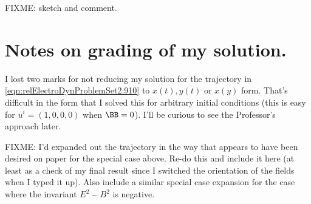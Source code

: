 FIXME: sketch and comment.

\section{Notes on grading of my solution.}

I lost two marks for not reducing my solution for the trajectory in \ref{eqn:relElectroDynProblemSet2:910} to $x(t), y(t)$ or $x(y)$ form.  That's difficult in the form that I solved this for arbitrary initial conditions (this is easy for $u^i = (1, 0, 0, 0)$ when $\BB = 0$).  I'll be curious to see the Professor's approach later.  

FIXME: I'd expanded out the trajectory in the way that appears to have been desired on paper for the special case above.  Re-do this and include it here (at least as a check of my final result since I switched the orientation of the fields when I typed it up).  Also include a similar special case expansion for the case where the invariant $E^2 - B^2$ is negative.

\EndNoBibArticle
